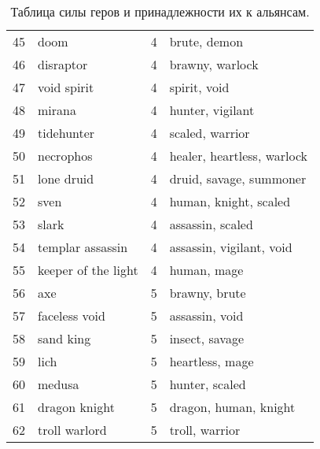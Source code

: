 \documentclass{article}
\begin{document}
\begin{table}
{\begin{tabular}{llrl}
45 &                 doom &      4 &                   brute, demon \\
46 &            disraptor &      4 &               brawny, warlock  \\
47 &          void spirit &      4 &                   spirit, void \\
48 &               mirana &      4 &               hunter, vigilant \\
49 &           tidehunter &      4 &               scaled, warrior  \\
50 &            necrophos &      4 &    healer, heartless, warlock  \\
51 &           lone druid &      4 &        druid, savage, summoner \\
52 &                 sven &      4 &          human, knight, scaled \\
53 &                slark &      4 &               assassin, scaled \\
54 &     templar assassin &      4 &       assassin, vigilant, void \\
55 &  keeper of the light &      4 &                    human, mage \\
56 &                  axe &      5 &                  brawny, brute \\
57 &        faceless void &      5 &                 assassin, void \\
58 &            sand king &      5 &                 insect, savage \\
59 &                 lich &      5 &                heartless, mage \\
60 &               medusa &      5 &                 hunter, scaled \\
61 &        dragon knight &      5 &          dragon, human, knight \\
62 &        troll warlord &      5 &                troll, warrior  \\
\bottomrule
\end{tabular}
}
\caption{Таблица силы геров и принадлежности их к альянсам. }
\end{table}

\end{document}
